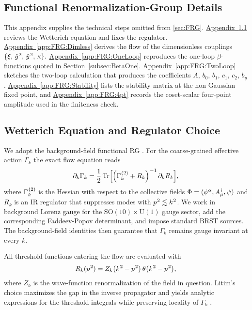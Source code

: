 \documentclass[pdflatex,sn-mathphys-num]{sn-jnl}
\theoremstyle{thmstyleone}
\theoremstyle{thmstyletwo}%
\theoremstyle{thmstylethree}%
\newcommand{\SO}[1]{\mathrm{SO(#1)}}
\newcommand{\U}[1]{\mathrm{U(#1)}}
\newcommand{\SOTen}{\SO{10}}
\newcommand{\UOne}{\U{1}}
\newcommand{\SOTenXUOne}{\SOTen \times \UOne}
\newcommand{\Tr}{\operatorname{Tr}}
\newcommand{\sm}{\hspace{.065em}}
\newcommand{\appref}[1]{\hyperref[#1]{Appendix~\ref*{#1}}}
\newcommand{\subsecref}[1]{\hyperref[#1]{Section~\ref*{#1}}}
\newcommand{\smexp}[1]{^{\sm #1}}
\begin{document}
\begin{appendices}
\section{Functional Renormalization-Group Details}
\label{app:FRG}

This appendix supplies the technical steps omitted from
\autoref{sec:FRG}.  
\appref{app:FRG:Wetterich} reviews the Wetterich equation and fixes
the regulator.  
\appref{app:FRG:Dimless} derives the flow of the dimensionless
couplings
\(
  \{\xi,\,\hat g\smexp{2},\,\hat y\smexp{2},\,\kappa\}.
\)
\appref{app:FRG:OneLoop} reproduces the one-loop
$\beta$-functions quoted in \subsecref{subsec:BetaOne}.  
\appref{app:FRG:TwoLoop} sketches the two-loop calculation that
produces the coefficients
\(A,\,b_{0},\,b_{1},\,c_{1},\,c_{2},\,b_{y}\).
\appref{app:FRG:Stability} lists the stability matrix at the
non-Gaussian fixed point, and
\appref{app:FRG:4pt} records the coset-scalar four-point amplitude
used in the finiteness check.

\subsection{Wetterich Equation and Regulator Choice}
\label{app:FRG:Wetterich}
We adopt the background-field functional RG \cite{Wetterich1993,Morris1994}.  
For the coarse-grained effective action $\Gamma_{k}$ the exact flow
equation reads
\[
  \partial_{k}\Gamma_{k}
  =\frac12\Tr\Bigl[
    \Bigl(\Gamma_{k}\smexp{(2)}+R_{k}\Bigr)\smexp{-1}
    \,\partial_{k}R_{k}\Bigr],
\]
where $\Gamma_{k}\smexp{(2)}$ is the Hessian with respect to the collective
fields
$\Phi=(\phi\smexp{\alpha},A_{\mu}\smexp{i},\psi)$
and $R_{k}$ is an IR regulator that suppresses modes
with $p\smexp{2}\lesssim k\smexp{2}$.
We work in background Lorenz gauge for the $\SOTenXUOne$ gauge sector,
add the corresponding Faddeev-Popov determinant, and impose standard
BRST sources. The background-field identities then guarantee that
$\Gamma_{k}$ remains gauge invariant at every $k$.

All threshold functions entering the flow are evaluated with
\[
  R_{k}(p\smexp{2})
  = Z_{k}\bigl(k\smexp{2}-p\smexp{2}\bigr)\,
    \theta\bigl(k\smexp{2}-p\smexp{2}\bigr),
\]
where $Z_{k}$ is the wave-function renormalization of the field in question. Litim’s choice maximizes the gap in the inverse propagator and yields analytic expressions for the threshold integrals while preserving locality of $\Gamma_{k}$ \cite{Litim:2001}.


\end{appendices}
\end{document}
